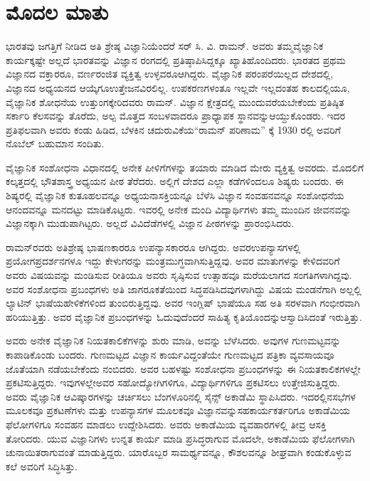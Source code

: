 
\chapter*{ಮೊದಲ ಮಾತು}


ಭಾರತವು ಜಗತ್ತಿಗೆ ನೀಡಿದ ಅತಿ ಶ್ರೇಷ್ಠ ವಿಜ್ಞಾನಿಯೆಂದರೆ ಸರ್ ಸಿ. ವಿ. ರಾಮನ್. ಅವರು ತಮ್ಮ\break ವೈಜ್ಞಾನಿಕ ಕಾರ್ಯಕ್ಕಷ್ಟೇ ಅಲ್ಲದೆ ಭಾರತವನ್ನು ವಿಜ್ಞಾನ ರಂಗದಲ್ಲಿ ಪ್ರತಿಷ್ಠಾಪಿಸಿದ್ದಕ್ಕೂ ಖ್ಯಾತಿ\break ಹೊಂದಿದರು. ಭಾರತದ ಪ್ರಥಮ ವಿಜ್ಞಾನದ ವಕ್ತಾರರೂ, ವರ್ಣರಂಜಿತ ವ್ಯಕ್ತಿತ್ವ ಉಳ್ಳವರೂ\break ಆಗಿದ್ದರು. ವೈಜ್ಞಾನಿಕ ಪರಂಪರೆಯಿಲ್ಲದ ದೇಶದಲ್ಲಿ, ವಿಜ್ಞಾನದ ಅಧ್ಯಯನದ ಆಯ್ಕೆಗೂ\break ಉತ್ತೇಜನವಿರಲಿಲ್ಲ. ಉಪಕರಣಗಳಂತೂ ಇಲ್ಲವೇ ಇಲ್ಲದಂತಹ ಕಾಲದಲ್ಲಿಯೂ, ವೈಜ್ಞಾನಿಕ ಶೋಧನೆಯ ಉತ್ತುಂಗಕ್ಕೇರಿದವರು ರಾಮನ್. ವಿಜ್ಞಾನ ಕ್ಷೇತ್ರದಲ್ಲಿ ಮುಂದುವರೆಯಬೇಕೆಂದು ಪ್ರತಿಷ್ಠಿತ ಸರ್ಕಾರಿ ಕೆಲಸವನ್ನು ತೊರೆದು, ಅಲ್ಪ ಮೊತ್ತದ ಸಂಬಳವಾದರೂ ಪ್ರಾಧ್ಯಾಪಕ ಸ್ಥಾನವನ್ನು\break ಆಯ್ದುಕೊಂಡರು. ಇದರ ಪ್ರತಿಫಲವಾಗಿ ಅವರು ಕಂಡು ಹಿಡಿದ, ಬೆಳಕಿನ ಚದುರುವಿಕೆಯ\break “ರಾಮನ್ ಪರಿಣಾಮ” ಕ್ಕೆ 1930 ರಲ್ಲಿ ಅವರಿಗೆ ನೊಬೆಲ್ ಬಹುಮಾನ ಸಂದಿತು. 

ವೈಜ್ಞಾನಿಕ ಸಂಶೋಧನಾ ವಿಧಾನದಲ್ಲಿ ಅನೇಕ ಪೀಳಿಗೆಗಳನ್ನು ತಯಾರು ಮಾಡಿದ ಮೇರು ವ್ಯಕ್ತಿತ್ವ ಅವರದು. ಮೊದಲಿಗೆ ಕಲ್ಕತ್ತದಲ್ಲಿ ಭೌತಶಾಸ್ತ್ರ ಅಧ್ಯಯನ ಪೀಠ ತೆರೆದರು. ಅಲ್ಲಿಗೆ ದೇಶದ ಎಲ್ಲಾ ಕಡೆಗಳಿಂದಲೂ ಶಿಷ್ಯರು ಬಂದರು. ಈ ಶಿಷ್ಯರಲ್ಲಿ ವೈಜ್ಞಾನಿಕ ಕುತೂಹಲವನ್ನೂ ಅಧ್ಯಯನಾಸಕ್ತಿ\break ಯನ್ನೂ ಬೆಳೆಸಿ ವಿಜ್ಞಾನ ಸಂವಹನವನ್ನೂ ಸಂಶೋಧನೆಯ ಆನಂದವನ್ನೂ ಮನದಟ್ಟು ಮಾಡಿ\break ಕೊಟ್ಟರು. ಇವರಲ್ಲಿ ಅನೇಕ ಮಂದಿ ವಿದ್ಯಾರ್ಥಿಗಳು ತಮ್ಮ ಮುಂದಿನ ಜೀವನವನ್ನು ವಿಜ್ಞಾನಕ್ಕಾಗಿ ಮುಡುಪಾಗಿಟ್ಟರು. ಅಲ್ಲದೆ ವಿವಿದೆಡೆಗಳಲ್ಲಿ ವಿಜ್ಞಾನ ಪೀಠಗಳನ್ನು ಪ್ರಾರಂಭಿಸಿದರು. 

ರಾಮನ್‌ರವರು ಅತಿಶ್ರೇಷ್ಠ ಭಾಷಣಕಾರರೂ ಉಪನ್ಯಾಸಕಾರರೂ ಆಗಿದ್ದರು. ಅವರ\break ಉಪನ್ಯಾಸಗಳಲ್ಲಿ ಪ್ರಯೋಗ\enginline{-}ಪ್ರದರ್ಶನಗಳೂ ಇದ್ದು ಕೇಳುಗರನ್ನು ಮಂತ್ರಮುಗ್ಧವಾಗಿಸುತ್ತಿದ್ದವು. ಅವರ ಮಾತುಗಳನ್ನು ಕೇಳಿದವರಿಗೆ ಅವರು ವಿಷಯವನ್ನು ಮಂಡಿಸುವ ರೀತಿಯೂ ಅವರು ಸೃಷ್ಠಿಸುವ ಉತ್ಸಾಹವೂ ಮರೆಯಲಾಗದ ಸಂಗತಿಗಳಾಗಿದ್ದವು. ಅವರ ಸಂಶೋಧನಾ ಪ್ರಬಂಧಗಳು ಅತಿ ಜಾಗರೂಕತೆಯಿಂದ ಸಿದ್ಧಪಡಿಸಿದವುಗಳಾಗಿದ್ದು ವಿಷಯ ಮಂಡನೆಗಾಗಿ ಅಲ್ಲಲ್ಲಿ ಲ್ಯಾಟಿನ್ ಭಾಷೆಯ\break ಹೇಳಿಕೆಗಳಿಂದ ತುಂಬಿರುತ್ತಿದ್ದವು. ಅವರ ಇಂಗ್ಲಿಷ್ ಭಾಷೆಯೂ ಸಹ ಅತಿ ಸರಳವಾಗಿ ಗಂಭೀರವಾಗಿ ಹರಿಯುತ್ತಿತ್ತು. ಅವರ ವೈಜ್ಞಾನಿಕ ಪ್ರಬಂಧಗಳನ್ನು ಓದುವುದೆಂದರೆ ಸಾಹಿತ್ಯ ಕೃತಿಯೊಂದನ್ನು\break ಆಸ್ವಾದಿಸಿದಂತೆ ಇರುತ್ತಿತ್ತು.


\eject

ಅವರು ಅನೇಕ ವೈಜ್ಞಾನಿಕ ನಿಯತಕಾಲಿಕೆಗಳನ್ನು ಶುರು ಮಾಡಿ, ಅವನ್ನು ಬೆಳೆಸಿದರು. ಅವುಗಳ ಗುಣಮಟ್ಟವನ್ನು ಕಾಪಾಡಿಕೊಂಡು ಬಂದರು. ಗುಣಮಟ್ಟದ ವಿಜ್ಞಾನ ಕಾರ್ಯವಿದ್ದಂತೆಯೇ ಗುಣಮಟ್ಟದ ಪತ್ರಿಕಾ ವ್ಯವಸಾಯವೂ ಜೊತೆಯಾಗಿ ನಡೆಯಬೇಕೆಂದು ನಂಬಿದರು. ಅವರ ಬಹಳಷ್ಟು ಸಂಶೋಧನಾ ಪ್ರಬಂಧಗಳನ್ನು ಈ ನಿಯತಕಾಲಿಕಗಳಲ್ಲೇ ಪ್ರಕಟಿಸುತ್ತಿದ್ದರು. ಇವುಗಳಲ್ಲೇ\break ಅವರ ಸಹೋದ್ಯೋಗಿಗಳಿಗೂ, ವಿದ್ಯಾರ್ಥಿಗಳಿಗೂ ಪ್ರಕಟಿಸಲು ಉತ್ತೇಜಿಸುತ್ತಿದ್ದರು. ಅವರು ವೈಜ್ಞಾನಿಕ ಆವಿಷ್ಕಾರಗಳನ್ನು ಚರ್ಚಿಸಲು ಬೆಂಗಳೂರಿನಲ್ಲಿ ಸೈನ್ಸ್ ಅಕಾಡೆಮಿ ಸ್ಥಾಪಿಸಿದರು. ಇದರಲ್ಲಿನ\break ಸಭೆಗಳ ಮೂಲಕವೂ ಪ್ರಕಟಣೆಗಳು ಮತ್ತು ಉಪನ್ಯಾಸಗಳ ಮೂಲಕವೂ ವಿಜ್ಞಾನವನ್ನು\break ಸಹಕಾರ್ಯಕರ್ತರಿಗೂ ಅಕಾಡೆಮಿಯ ಫೆಲೋಗಳಿಗೂ ಸಂವಹನ ಮಾಡಲು ಉದ್ದೇಶಿಸಿದರು. ಅವರು ಅಕಾಡೆಮಿಯ ವ್ಯವಹಾರಗಳಲ್ಲಿ ತೀವ್ರ ಆಸಕ್ತಿ ತೋರಿದರು. ಯುವ ವಿಜ್ಞಾನಿಗಳು ಉನ್ನತ ಕಾರ್ಯ ಮಾಡಿ ಪ್ರಸಿದ್ಧರಾಗುವ ಮೊದಲೇ, ಅಕಾಡೆಮಿಯ ಫೆಲೋಗಳಾಗಿ ಚುನಾಯಿತರಾಗುವಂತೆ ಮಾಡುತ್ತಿದ್ದರು. ಯಾರೊಬ್ಬರ ಸಾಮರ್ಥ್ಯವನ್ನೂ, ಕೌಶಲವನ್ನೂ ಶೀಘ್ರವಾಗಿ ಕಂಡುಕೊಳ್ಳುವ ಕಲೆ ಅವರಿಗೆ ಸಿದ್ಧಿಸಿತ್ತು.


